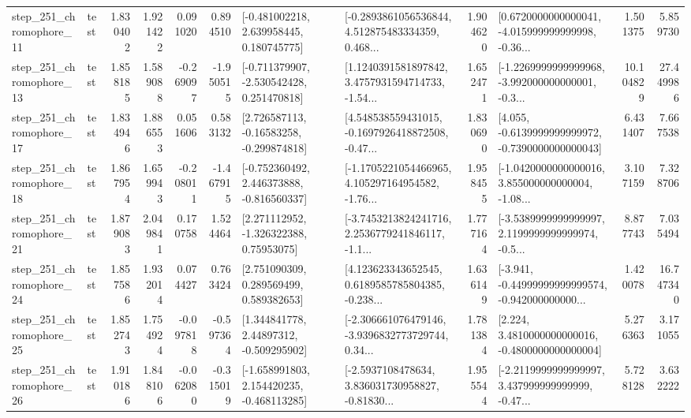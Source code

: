 \begin{tabular}{llrrrrllrlrr}
  step\_251\_chromophore\_11 &      test &      1.830402 &    1.921422 &      0.091020 &  0.894510 &    [-0.481002218, 2.639958445, 0.180745775] &  [-0.2893861056536844, 4.512875483334359, 0.468... &       1.904620 &  [0.6720000000000041, -4.015999999999998, -0.36... &            1.501375 &          5.859730 \\
  step\_251\_chromophore\_13 &      test &      1.858185 &    1.589088 &     -0.269097 & -1.950515 &   [-0.711379907, -2.530542428, 0.251470818] &  [1.1240391581897842, 3.4757931594714733, -1.54... &       1.652471 &  [-1.2269999999999968, -3.992000000000001, -0.3... &           10.104829 &         27.449986 \\
  step\_251\_chromophore\_17 &      test &      1.834946 &    1.886553 &      0.051606 &  0.583132 &    [2.726587113, -0.16583258, -0.299874818] &  [4.548538559431015, -0.1697926418872508, -0.47... &       1.830690 &  [4.055, -0.6139999999999972, -0.7390000000000043] &            6.431407 &          7.667538 \\
  step\_251\_chromophore\_18 &      test &      1.867954 &    1.659943 &     -0.208011 & -1.467915 &   [-0.752360492, 2.446373888, -0.816560337] &  [-1.1705221054466965, 4.105297164954582, -1.76... &       1.958455 &  [-1.0420000000000016, 3.855000000000004, -1.08... &            3.107159 &          7.328706 \\
  step\_251\_chromophore\_21 &      test &      1.879083 &    2.049841 &      0.170758 &  1.524464 &     [2.271112952, -1.326322388, 0.75953075] &  [-3.7453213824241716, 2.2536779241846117, -1.1... &       1.777164 &  [-3.5389999999999997, 2.1199999999999974, -0.5... &            8.877743 &          7.035494 \\
  step\_251\_chromophore\_24 &      test &      1.857586 &    1.932014 &      0.074427 &  0.763424 &     [2.751090309, 0.289569499, 0.589382653] &  [4.123623343652545, 0.6189585785804385, -0.238... &       1.636149 &  [-3.941, -0.44999999999999574, -0.942000000000... &            1.420078 &         16.747340 \\
  step\_251\_chromophore\_25 &      test &      1.852743 &    1.754924 &     -0.097818 & -0.597364 &     [1.344841778, 2.44897312, -0.509295902] &  [-2.306661076479146, -3.9396832773729744, 0.34... &       1.781384 &   [2.224, 3.4810000000000016, -0.4800000000000004] &            5.276363 &          3.171055 \\
  step\_251\_chromophore\_26 &      test &      1.910186 &    1.848106 &     -0.062080 & -0.315019 &   [-1.658991803, 2.154420235, -0.468113285] &  [-2.5937108478634, 3.836031730958827, -0.81830... &       1.955544 &  [-2.2119999999999997, 3.437999999999999, -0.47... &            5.728128 &          3.632222 \\

\end{tabular}
